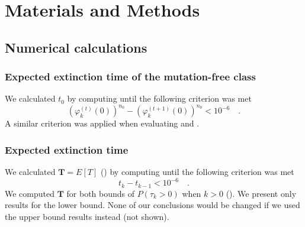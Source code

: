 \documentclass[9pt,lineno]{elife}
\begin{document}
%
%
%
%






\section{Materials and Methods}




\subsection{Numerical calculations}

\subsubsection{Expected extinction time of the mutation-free class}
We calculated $t_0$ by computing  until the following criterion was met 
%
\begin{equation*}
\left(\varphi_{k}^{(t)}(0)\right)^{n_{0}} - \left(\varphi_{k}^{(t+1)}(0)\right)^{n_{0}} < 10^{-6} \quad .
\end{equation*}
%
A similar criterion was applied when evaluating  and . 

\subsubsection{Expected extinction time}
We calculated $\mathbf{T}=E[T]$ () by computing  until the following criterion was met 
%
\begin{equation*}
t_k - t_{k-1} < 10^{-6} \quad .
\end{equation*}
%
We computed $\mathbf{T}$ for both bounds of $P(\tau_{k} > 0)$ when $k>0$ ().  We present only results for the lower bound.  None of our conclusions would be changed if we used the upper bound results instead (not shown).
\end{document}
